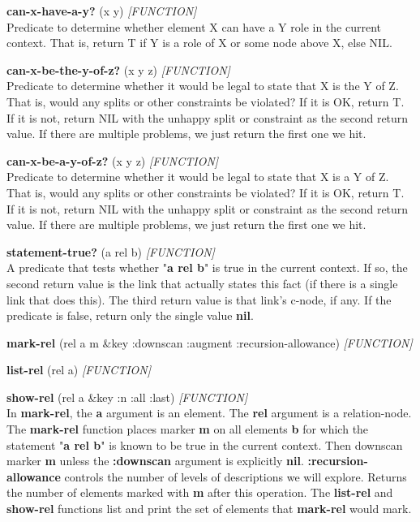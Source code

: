 \documentclass[titlepage,twoside,openright,11pt]{article}
\begin{document}
\textbf{can-x-have-a-y?} (x y) \emph{{[}FUNCTION{]}}\\
Predicate to determine whether element X can have a Y role in the
current context. That is, return T if Y is a role of X or some node
above X, else NIL.

\textbf{can-x-be-the-y-of-z?} (x y z) \emph{{[}FUNCTION{]}}\\
Predicate to determine whether it would be legal to state that X is the
Y of Z. That is, would any splits or other constraints be violated? If
it is OK, return T. If it is not, return NIL with the unhappy split or
constraint as the second return value. If there are multiple problems,
we just return the first one we hit.

\textbf{can-x-be-a-y-of-z?} (x y z) \emph{{[}FUNCTION{]}}\\
Predicate to determine whether it would be legal to state that X is a Y
of Z. That is, would any splits or other constraints be violated? If it
is OK, return T. If it is not, return NIL with the unhappy split or
constraint as the second return value. If there are multiple problems,
we just return the first one we hit.

\textbf{statement-true?} (a rel b) \emph{{[}FUNCTION{]}\\
}A predicate that tests whether "\textbf{a rel b}" is true in the
current context. If so, the second return value is the link that
actually states this fact (if there is a single link that does this).
The third return value is that link's c-node, if any. If the predicate
is false, return only the single value \textbf{nil}.

\textbf{mark-rel} (rel a m \&key :downscan :augment
:recursion-allowance) \emph{{[}FUNCTION{]}}

\textbf{list-rel} (rel a) \emph{{[}FUNCTION{]}}

\textbf{show-rel} (rel a \&key :n :all :last) \emph{{[}FUNCTION{]}\\
}In \textbf{mark-rel}, the \textbf{a} argument is an element. The
\textbf{rel} argument is a relation-node. The \textbf{mark-rel} function
places marker \textbf{m} on all elements \textbf{b} for which the
statement "\textbf{a rel b}" is known to be true in the current context.
Then downscan marker \textbf{m} unless the \textbf{:downscan} argument
is explicitly \textbf{nil}. \textbf{:recursion-allowance} controls the
number of levels of descriptions we will explore. Returns the number of
elements marked with \textbf{m} after this operation. The
\textbf{list-rel} and \textbf{show-rel} functions list and print the set
of elements that \textbf{mark-rel} would mark.
\end{document}
